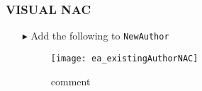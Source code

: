 \hypertarget{NAC vis}{}
\subsubsection{VISUAL NAC}
\texHeader

\begin{itemize}

\item[$\blacktriangleright$] Add the following to \texttt{NewAuthor}

\begin{figure}[htbp]
\begin{center}
  \texttt{[image: ea\_existingAuthorNAC]}
  \caption{comment}
  \label{ea:existingAuthorNAC}
\end{center}
\end{figure}

\end{itemize}
